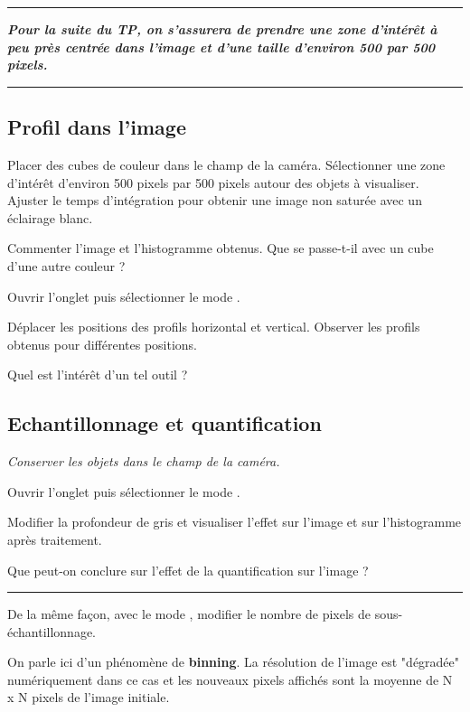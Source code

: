 \noindent \rule{\linewidth}{1pt}

\textit{\textbf{Pour la suite du TP, on s'assurera de prendre une zone d'intérêt à peu près centrée dans l'image et d'une taille d'environ 500 par 500 pixels.}}

\noindent \rule{\linewidth}{1pt}

\subsection{Profil dans l'image}

\Manip Placer des cubes de couleur dans le champ de la caméra. Sélectionner une zone d'intérêt d'environ 500 pixels par 500 pixels autour des objets à visualiser. Ajuster le temps d'intégration pour obtenir une image non saturée avec un éclairage blanc. 

\Quest Commenter l'image et l'histogramme obtenus. Que se passe-t-il avec un cube d'une autre couleur ?

\Manip Ouvrir l'onglet  puis sélectionner le mode .

\Manip Déplacer les positions des profils horizontal et vertical. Observer les profils obtenus pour différentes positions.

\Quest Quel est l'intérêt d'un tel outil ?


\subsection{Echantillonnage et quantification}

\textit{Conserver les objets dans le champ de la caméra.}

\Manip Ouvrir l'onglet  puis sélectionner le mode .

\Manip Modifier la profondeur de gris et visualiser l'effet sur l'image et sur l'histogramme après traitement.

\Quest Que peut-on conclure sur l'effet de la quantification sur l'image ?

\noindent \rule{\linewidth}{1pt}

\Manip De la même façon, avec le mode , modifier le nombre de pixels de sous-échantillonnage. 

On parle ici d'un phénomène de \textbf{binning}. La résolution de l'image est "dégradée" numériquement dans ce cas et les nouveaux pixels affichés sont la moyenne de N x N pixels de l'image initiale.

